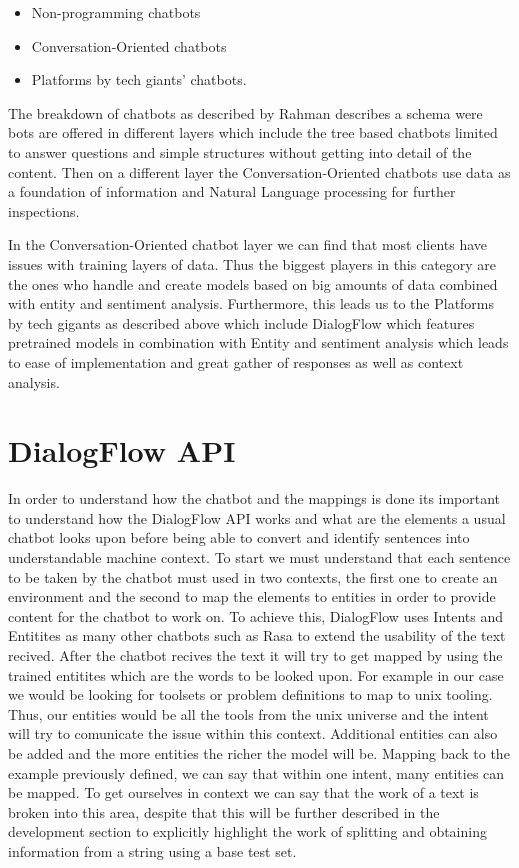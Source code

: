 \begin{itemize}
    \item Non-programming chatbots
    \item Conversation-Oriented chatbots 
    \item Platforms by tech giants' chatbots.
\end{itemize}
The breakdown of chatbots as described by Rahman\cite{chatbot_reference} describes a schema were bots are offered in different layers which include the tree based chatbots limited to answer questions and simple structures without getting into detail of the content. Then on a different layer the Conversation-Oriented chatbots use data as a foundation of information and Natural Language processing for further inspections.

In the Conversation-Oriented chatbot layer we can find that most clients have issues with training layers of data. Thus the biggest players in this category are the ones who handle and create models based on big amounts of data combined with entity and sentiment analysis. Furthermore, this leads us to the Platforms by tech gigants as described above which include DialogFlow which features pretrained models in combination with Entity and sentiment analysis which leads to ease of implementation and great gather of responses as well as context analysis.

\section{DialogFlow API}

In order to understand how the chatbot and the mappings is done its important to understand how the DialogFlow API works and what are the elements a usual chatbot looks upon before being able to convert and identify sentences into understandable machine context. To start we must understand that each sentence to be taken by the chatbot must used in two contexts, the first one to create an environment and the second to map the elements to entities in order to provide content for the chatbot to work on. To achieve this, DialogFlow uses Intents and Entitites as many other chatbots such as Rasa to extend the usability of the text recived. After the chatbot recives the text it will try to get mapped by using the trained entitites which are the words to be looked upon. For example in our case we would be looking for toolsets or problem definitions to map to unix tooling. Thus, our entities would be all the tools from the unix universe and the intent will try to comunicate the issue within this context. Additional entities can also be added and the more entities the richer the model will be. Mapping back to the example previously defined, we can say that within one intent, many entities can be mapped. To get ourselves in context we can say that the work of a text is broken into this area, despite that this will be further described in the development section to explicitly highlight the work of splitting and obtaining information from a string using a base test set.

